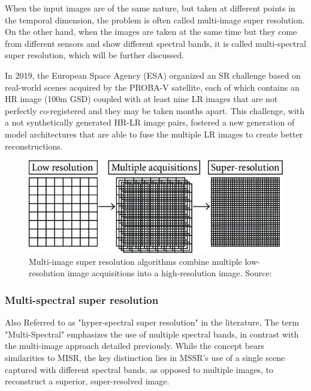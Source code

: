         When the input images are of the same nature, but taken at different points in the temporal dimension, the problem is often called multi-image super resolution. On the other hand, when the images are taken at the same time but they come from different sensors and show different spectral bands, it is called multi-spectral super resolution, which will be further discussed. 

        In 2019, the European Space Agency (ESA) organized an SR challenge  \cite{martens2019superresolution} based on real-world scenes acquired by the PROBA-V satellite, each of which contains an HR image (100m GSD) coupled with at least nine LR images that are not perfectly co-registered and they may be taken months apart. This challenge, with a not synthetically generated HR-LR image pairs, fostered a new generation of model architectures that are able to fuse the multiple LR images to create better reconstructions.

        \begin{figure}[h!]
            \centering
            \includegraphics[scale=1.5]{Includes/2-MISR.jpeg}
            \caption{Multi-image super resolution algorithms combine multiple low-resolution image acquisitions into a high-resolution image. Source: \cite{MISR2007}}
            \label{fig:2-MISR}
        \end{figure}
        
        \subsubsection{Multi-spectral super resolution}

        Also Referred to as "hyper-spectral super resolution" in the literature, The term "Multi-Spectral" emphasizes the use of multiple spectral bands, in contrast with the multi-image approach detailed previously. While the concept bears similarities to MISR, the key distinction lies in MSSR's use of a single scene captured with different spectral bands, as opposed to multiple images, to reconstruct a superior, super-resolved image.

